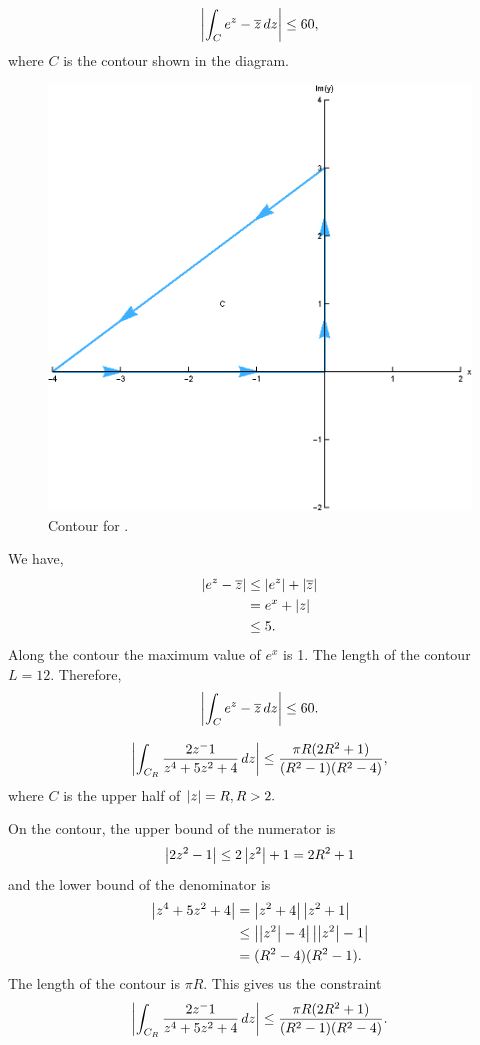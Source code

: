 \documentclass[12pt]{book}
\begin{document}
\begin{exmp}
    \[
        \left\lvert \int_{C} e^z - \overline{z}\,dz \right\rvert \leq 60, 
    \]
    where $C$ is the contour shown in the diagram. 
\end{exmp}
\begin{figure}[H]
    \centering
    \includegraphics[scale = 0.7]{./figs/chapter_2/ci_contour_ex_3.eps}
    \caption{Contour for .}
\end{figure}
We have, 
\begin{align*}
    \left\lvert e^z - \overline{z} \right\rvert
        &\leq
            \left\lvert e^z \right\rvert + \left\lvert \overline{z} \right\rvert \\
        &=
            e^x + \left\lvert z \right\rvert \\
        &\leq 
            5.
\end{align*}
Along the contour the maximum value of $e^x$ is 1. The length of the contour $L = 12.$ Therefore, 
    \[
        \left\lvert \int_{C} e^z - \overline{z}\,dz \right\rvert \leq 60.
    \]

\begin{exmp}
    \[
        \left\lvert \int_{C_R} \frac{2z^ - 1}{z^4 + 5z^2 + 4}\,dz \right\rvert \leq \frac{\pi R (2R^2 + 1)}{(R^2 - 1)(R^2 - 4)},
    \]
    where $C$ is the upper half of $\left\lvert z \right\rvert = R, R > 2.$
\end{exmp}
On the contour, the upper bound of the numerator is 
\[
    \left\lvert 2z^2 - 1 \right\rvert \leq 2\left\lvert z^2 \right\rvert + 1 = 2R^2 + 1
\]
and the lower bound of the denominator is 
\begin{align*}
    \left\lvert z^4 + 5z^2 + 4 \right\rvert
        &=
            \left\lvert z^2 + 4 \right\rvert\left\lvert z^2 + 1 \right\rvert \\
        &\leq
            \left\lvert \left\lvert z^2 \right\rvert -4 \right\rvert\left\lvert \left\lvert z^2 \right\rvert - 1 \right\rvert \\
        &=
            (R^2 - 4)(R^2 - 1).
\end{align*}
The length of the contour is $\pi R.$ This gives us the constraint 
\[
    \left\lvert \int_{C_R} \frac{2z^ - 1}{z^4 + 5z^2 + 4}\,dz \right\rvert \leq \frac{\pi R (2R^2 + 1)}{(R^2 - 1)(R^2 - 4)}.
\]
\end{document}
